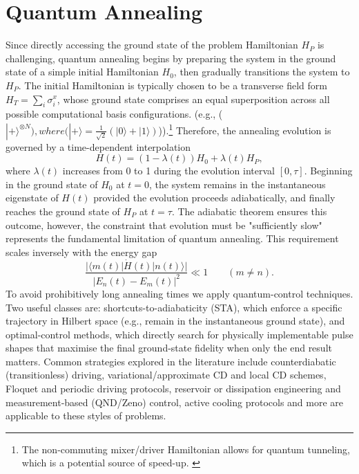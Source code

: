 \section{Quantum Annealing}
\qquad Since directly accessing the ground state of the problem Hamiltonian $H_P$ is challenging, quantum annealing begins by preparing the system in the ground state of a simple initial Hamiltonian $H_0$, then gradually transitions the system to $H_P$. The initial Hamiltonian is typically chosen to be a transverse field form $H_T = \sum_i \sigma_i^x$, whose ground state comprises an equal superposition across all possible computational basis configurations. (e.g., ($|+\rangle^{\otimes N}), where (|+\rangle = \frac{1}{\sqrt{2}}(|0\rangle + |1\rangle)$)).\footnote{The non-commuting mixer/driver Hamiltonian allows for quantum tunneling, which is a potential source of speed-up. \cite{NASAQASpeedUp2018}} Therefore, the annealing evolution is governed by a time-dependent interpolation
\begin{equation}
    H(t) = (1-\lambda(t))H_0 + \lambda(t)H_P,
\end{equation}
where $\lambda(t)$ increases from 0 to 1 during the evolution interval $[0, \tau]$. Beginning in the ground state of $H_0$ at $t=0$, the system remains in the instantaneous eigenstate of $H(t)$ provided the evolution proceeds adiabatically, and finally reaches the ground state of $H_P$ at $t=\tau$. The adiabatic theorem ensures this outcome, however, the constraint that evolution must be "sufficiently slow" represents the fundamental limitation of quantum annealing.\cite{Amin2009ConsistencyAdiabatic} This requirement scales inversely with the energy gap
\begin{equation}
    \frac{|\langle m(t)|\dot H(t)|n(t)\rangle|}{|E_n(t) - E_m(t)|^2} \ll 1 \qquad (m \neq n).
\end{equation}
\qquad To avoid prohibitively long annealing times we apply quantum-control techniques. Two useful classes are: shortcuts-to-adiabaticity (STA), which enforce a specific trajectory in Hilbert space (e.g., remain in the instantaneous ground state), and optimal-control methods, which directly search for physically implementable pulse shapes that maximise the final ground-state fidelity when only the end result matters. Common strategies explored in the literature include counterdiabatic (transitionless) driving\cite{BerryCounterdiabatic2009}, variational/approximate CD and local CD schemes\cite{COLD2023}, Floquet and periodic driving protocols\cite{CAFFEINE2025}, reservoir or dissipation engineering and measurement‑based (QND/Zeno) control\cite{ResEngSTA}, active cooling protocols\cite{CoolingLangbehn2025} and more are applicable to these styles of problems.
